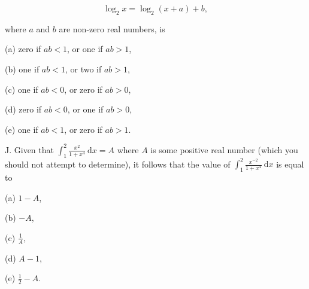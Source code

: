 \documentclass[10pt]{article}
\begin{document}
$$
\log _{2} x=\log _{2}(x+a)+b,
$$

where $a$ and $b$ are non-zero real numbers, is

(a) zero if $a b<1$, or one if $a b>1$,

(b) one if $a b<1$, or two if $a b>1$,

(c) one if $a b<0$, or zero if $a b>0$,

(d) zero if $a b<0$, or one if $a b>0$,

(e) one if $a b<1$, or zero if $a b>1$.

J. Given that $\int_{1}^{2} \frac{x^{2}}{1+x^{4}} \mathrm{~d} x=A$ where $A$ is some positive real number (which you should not attempt to determine), it follows that the value of $\int_{1}^{2} \frac{x^{-2}}{1+x^{4}} \mathrm{~d} x$ is equal to

(a) $1-A$,

(b) $-A$,

(c) $\frac{1}{A}$,

(d) $A-1$,

(e) $\frac{1}{2}-A$.
\end{document}
